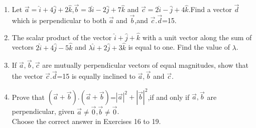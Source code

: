 \begin{enumerate}[label=\thesection.\arabic*,ref=\thesection.\theenumi]
	\solution
		
\item Let $\vec{a}=\hat{i}+4\hat{j}+2\hat{k}$,$\vec{b}=3\hat{i}-2\hat{j}+7\hat{k}$ and $\vec{c}=2\hat{i}-\hat{j}+4\hat{k}$.Find a vector $\vec{d}$ which is perpendicular to both $\vec{a}$ and $\vec{b}$,and $\vec{c}.\vec{d}$=15.\\
	\solution
		
\item The scalar product of the vector $\hat{i}+\hat{j}+\hat{k}$ with a unit vector along the sum of vectors $2\hat{i}+4\hat{j}-5\hat{k}$ and $\lambda\hat{i}+2\hat{j}+3\hat{k}$ is equal to one. Find the value of $\lambda$.\\
\item If $\vec{a},\vec{b},\vec{c}$ are mutually perpendicular vectors of equal magnitudes, show that the vector $\vec{c}.\vec{d}$=15 is equally inclined to $\vec{a},\vec{b}$ and $\vec{c}$.\\
\item Prove that $(\vec{a}+\vec{b}).(\vec{a}+\vec{b})$=$|{\vec{a}}|^2+|{\vec{b}}|^2$,if and only if $\vec{a},\vec{b}$ are perpendicular, given $\vec{a}\neq\vec{0}$,$\vec{b}\neq\vec{0}$.\\

Choose the correct answer in Exercises 16 to 19.


\end{enumerate}
